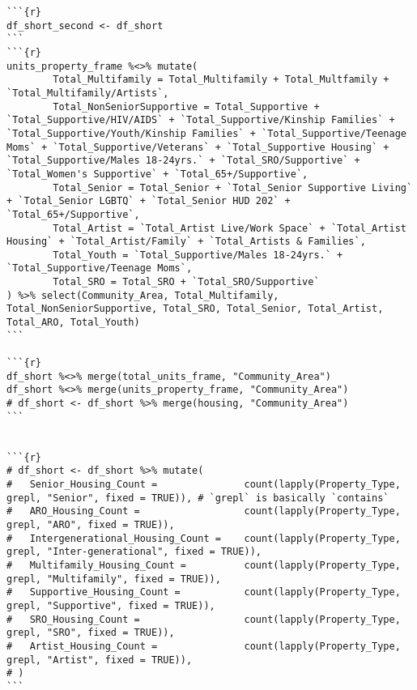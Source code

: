 \documentclass{article}
\begin{document}
\begin{verbatim}
```{r}
df_short_second <- df_short
```
```{r}
units_property_frame %<>% mutate(
        Total_Multifamily = Total_Multifamily + Total_Multfamily + `Total_Multifamily/Artists`,
        Total_NonSeniorSupportive = Total_Supportive + `Total_Supportive/HIV/AIDS` + `Total_Supportive/Kinship Families` + `Total_Supportive/Youth/Kinship Families` + `Total_Supportive/Teenage Moms` + `Total_Supportive/Veterans` + `Total_Supportive Housing` + `Total_Supportive/Males 18-24yrs.` + `Total_SRO/Supportive` + `Total_Women's Supportive` + `Total_65+/Supportive`,
        Total_Senior = Total_Senior + `Total_Senior Supportive Living` + `Total_Senior LGBTQ` + `Total_Senior HUD 202` + `Total_65+/Supportive`,
        Total_Artist = `Total_Artist Live/Work Space` + `Total_Artist Housing` + `Total_Artist/Family` + `Total_Artists & Families`,
        Total_Youth = `Total_Supportive/Males 18-24yrs.` + `Total_Supportive/Teenage Moms`,
        Total_SRO = Total_SRO + `Total_SRO/Supportive`
) %>% select(Community_Area, Total_Multifamily, Total_NonSeniorSupportive, Total_SRO, Total_Senior, Total_Artist, Total_ARO, Total_Youth)
```

```{r}
df_short %<>% merge(total_units_frame, "Community_Area")
df_short %<>% merge(units_property_frame, "Community_Area")
# df_short <- df_short %>% merge(housing, "Community_Area")
```


```{r}
# df_short <- df_short %>% mutate(
#   Senior_Housing_Count =               count(lapply(Property_Type, grepl, "Senior", fixed = TRUE)), # `grepl` is basically `contains`
#   ARO_Housing_Count =                  count(lapply(Property_Type, grepl, "ARO", fixed = TRUE)),
#   Intergenerational_Housing_Count =    count(lapply(Property_Type, grepl, "Inter-generational", fixed = TRUE)),
#   Multifamily_Housing_Count =          count(lapply(Property_Type, grepl, "Multifamily", fixed = TRUE)),
#   Supportive_Housing_Count =           count(lapply(Property_Type, grepl, "Supportive", fixed = TRUE)),
#   SRO_Housing_Count =                  count(lapply(Property_Type, grepl, "SRO", fixed = TRUE)),
#   Artist_Housing_Count =               count(lapply(Property_Type, grepl, "Artist", fixed = TRUE)),
# )
```


\end{verbatim}
\end{document}
